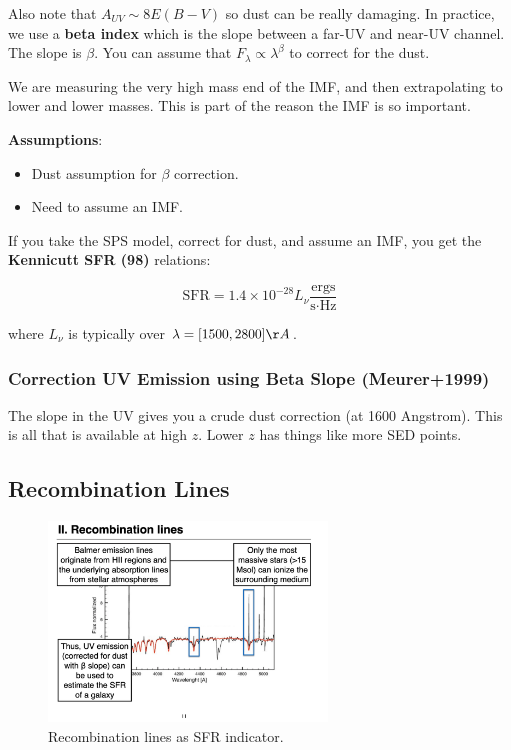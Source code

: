 \documentclass{article}
\begin{document}
Also note that $A_{UV} \sim 8 E(B-V)$ so dust can be really damaging. In practice, we use a \textbf{beta index} which is the slope between a far-UV and near-UV channel. The slope is $\beta$. You can assume that $F_\lambda \propto \lambda^\beta$ to correct for the dust. 

We are measuring the very high mass end of the IMF, and then extrapolating to lower and lower masses. This is part of the reason the IMF is so important. 

\textbf{Assumptions}:
\begin{itemize}
    \item Dust assumption for $\beta$ correction.
    \item Need to assume an IMF.
\end{itemize}

If you take the SPS model, correct for dust, and assume an IMF, you get the \textbf{Kennicutt SFR (98)} relations:

\begin{equation}
    \text{SFR} = 1.4\times10^{-28} L_\nu \frac{\text{ergs}}{\text{s}\cdot \text{Hz}}
\end{equation}

where $L_\nu$ is typically over $\lambda = [1500, 2800] \AA$.

\subsubsection{Correction UV Emission using Beta Slope (Meurer+1999)}

The slope in the UV gives you a crude dust correction (at 1600 Angstrom). This is all that is available at high $z$. Lower $z$ has things like more SED points. 

\subsection{Recombination Lines}

\begin{figure}
    \centering
    \includegraphics[width=0.66\textwidth]{figs/Screen Shot 2021-09-24 at 3.37.34 PM.png}
    \caption{Recombination lines as SFR indicator.}
    \label{fig:recomb_lines}
\end{figure}
\end{document}
